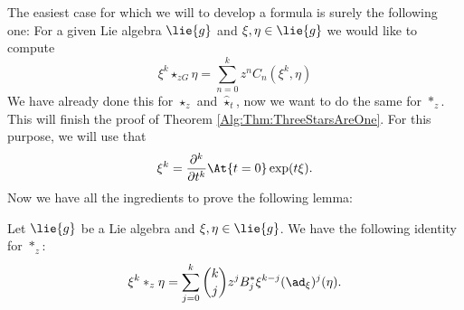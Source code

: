 The easiest case for which we will to develop a formula is surely the 
following one: For a given Lie algebra $\lie{g}$ and $\xi, \eta \in 
\lie{g}$ we would like to compute
\begin{equation*}
    \xi^k \star_{zG} \eta
    =
    \sum\limits_{n=0}^k
    z^n C_n(\xi^k, \eta)
\end{equation*}
We have already done this for $\star_z$ and $\widehat{\star}_t$, now we 
want to do the same for $\ast_z$. This will finish the proof of Theorem 
\ref{Alg:Thm:ThreeStarsAreOne}. For this purpose, we will use that
\begin{equation}\label{Formulas:MonomialDerivative}
    \xi^k
    =
    \frac{\partial^k}{\partial t^k}
    \At{t = 0} \exp(t \xi).
\end{equation}
Now we have all the ingredients to prove the following lemma:
\begin{lemma}
    \label{Formulas:Lemma:LinearMonomial1}
    Let $\lie{g}$ be a Lie algebra and $\xi, \eta \in \lie{g}$. We
    have the following identity for $\ast_z$:
    \begin{equation}
        \label{Formulas:LinearMonomial1}
        \xi^k \ast_z \eta
        =
        \sum\limits_{j=0}^k
        \binom{k}{j} z^j B_j^*
        \xi^{k-j}(\ad_{\xi})^j (\eta).
    \end{equation}
\end{lemma}
